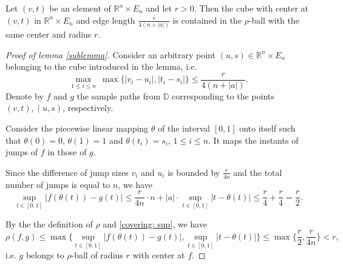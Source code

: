 \documentclass[10pt,a4paper]{amsart}
\let\le\leqslant
\newcommand\D{\mathbb D}
\newcommand\ro{\rho}
\newcommand{\R}{\mathbb{R}}
\begin{document}
\begin{lemma}\label{sublemma}
    Let $(v, t)$ be an element of $\R^n\times E_n$ and let $r>0$. Then the cube with center 
    at $(v,t)$ in $\R^n\times E_n$ and edge length $\tfrac{r}{4(n + |a|)}$ is contained in the 
    $\ro$-ball with the same center and radius $r$.
\end{lemma}

\begin{proof}[Proof of lemma \ref{sublemma}]
Consider an arbitrary point $(u,s)\in \R^n\times E_n$ belonging to the cube introduced in the lemma,
i.e.
\[
    \max_{1\le i\le n} \ \max\{ |v_i-u_i|, |t_i-s_i| \} \le \frac{r}{4(n + |a|)}.
\]
Denote by $f$ and $g$ the sample paths from $\D$ corresponding to the points $(v,t), (u,s)$, respectively.
            
Consider the piecewise linear mapping $\theta$ of the interval $[0,1]$ onto itself such that 
$\theta(0) = 0$, $\theta(1) = 1$ and $\theta(t_i) = s_i$, $1\le i\le n$. 
It maps the instants of jumps of $f$ in those of $g$. 

Since the difference of jump sizes  $v_i$ and $u_i$ is bounded by $\frac{r}{4n}$
and the total number of jumps is equal to $n$, we have 
\begin{equation}\label{covering: sup}
                \sup_{t\in[0, 1]} |f(\theta(t)) - g(t)| \le \frac{r}{4n} \cdot n 
                 + |a|\cdot\sup_{t\in[0,1]}|t - \theta(t)| \le \frac{r}{4} + \frac{r}{4} = \frac{r}{2}.    
\end{equation}
            
By the the definition of $\ro$ and \eqref{covering: sup}, we have  
\[
   \ro(f, g) \le \max\big\{\sup_{t\in[0, 1]} |f(\theta(t)) - g(t)|, \sup_{t\in[0,1]}|t - \theta(t)|\big\} 
   \le \max\big\{\frac{r}{2}, \frac{r}{4n}\big\} < r,
\]
i.e. $g$ belongs to $\ro$-ball of radius $r$ with center at $f$.
\end{proof}
\end{document}
